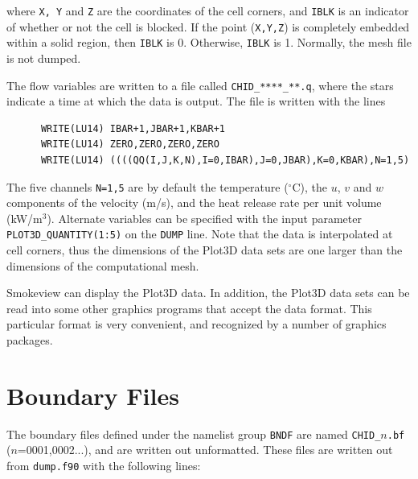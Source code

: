 \documentclass[11pt]{book}
\newcommand{\ct}{\tt\small}
\begin{document}
\noindent
where {\ct X, Y} and {\ct Z} are the coordinates of the cell corners,
and {\ct IBLK} is an indicator of whether or not the cell is blocked.
If the point ({\ct X,Y,Z}) is completely embedded within a solid region,
then {\ct IBLK} is 0. Otherwise, {\ct IBLK} is 1. Normally, the mesh
file is not dumped.

The flow variables are written to a file called {\ct CHID\_****\_**.q},
where the stars indicate a time at which the data is output.
The file is written with the lines

\footnotesize
\begin{verbatim}
      WRITE(LU14) IBAR+1,JBAR+1,KBAR+1
      WRITE(LU14) ZERO,ZERO,ZERO,ZERO
      WRITE(LU14) ((((QQ(I,J,K,N),I=0,IBAR),J=0,JBAR),K=0,KBAR),N=1,5)
\end{verbatim}
\normalsize
The five channels {\ct N=1,5} are by default the temperature
($^\circ$C), the $u$, $v$ and
$w$ components of the velocity (m/s), and the heat release rate
per unit volume (kW/m$^3$). Alternate variables can be specified with
the input parameter {\ct PLOT3D\_QUANTITY(1:5)} on the {\ct DUMP} line.
Note that the data is interpolated at
cell corners, thus the dimensions of the Plot3D data sets are
one larger than the dimensions of the computational mesh.

Smokeview can display the Plot3D data. In
addition, the Plot3D data sets can be read into some other graphics
programs that accept the data format.
This particular format is very convenient, and recognized by
a number of graphics packages.


\section{Boundary Files}
\label{out:BNDF}
The boundary files defined under the namelist group {\ct BNDF} are
named {\ct CHID\_$n$.bf} ($n$=0001,0002...),
and are written out unformatted.
These files are written out from {\ct dump.f90} with the following lines:
\end{document}
